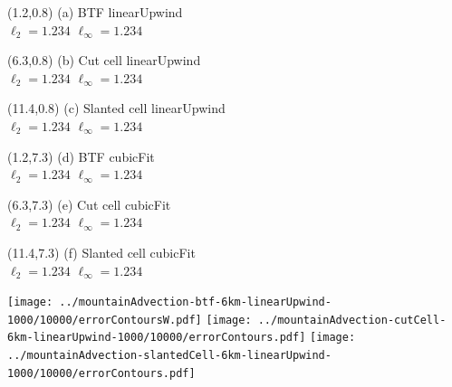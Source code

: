 \documentclass{article}
\begin{document}
\TPMargin{1pt}
\begin{textblock}{4}(1.2,0.8)
\normalsize
(a) BTF linearUpwind \\
\hspace*{1.4em}$\ell_2 = \num{1.234}$
\hspace*{1.4em}$\ell_\infty = \num{1.234}$
\end{textblock}
\begin{textblock}{4}(6.3,0.8)
\normalsize
(b) Cut cell linearUpwind \\
\hspace*{1.4em}$\ell_2 = \num{1.234}$
\hspace*{1.4em}$\ell_\infty = \num{1.234}$
\end{textblock}
\begin{textblock}{4}(11.4,0.8)
\normalsize
(c) Slanted cell linearUpwind \\
\hspace*{1.4em}$\ell_2 = \num{1.234}$
\hspace*{1.4em}$\ell_\infty = \num{1.234}$
\end{textblock}
\begin{textblock}{4}(1.2,7.3)
\normalsize
(d) BTF cubicFit \\
\hspace*{1.4em}$\ell_2 = \num{1.234}$
\hspace*{1.4em}$\ell_\infty = \num{1.234}$
\end{textblock}
\begin{textblock}{4}(6.3,7.3)
\normalsize
(e) Cut cell cubicFit \\
\hspace*{1.4em}$\ell_2 = \num{1.234}$
\hspace*{1.4em}$\ell_\infty = \num{1.234}$
\end{textblock}
\begin{textblock}{4}(11.4,7.3)
\normalsize
(f) Slanted cell cubicFit \\
\hspace*{1.4em}$\ell_2 = \num{1.234}$
\hspace*{1.4em}$\ell_\infty = \num{1.234}$
\end{textblock}
\texttt{[image: ../mountainAdvection-btf-6km-linearUpwind-1000/10000/errorContoursW.pdf]}
\hspace*{0.26em}
\texttt{[image: ../mountainAdvection-cutCell-6km-linearUpwind-1000/10000/errorContours.pdf]}
\hspace*{0.26em}
\texttt{[image: ../mountainAdvection-slantedCell-6km-linearUpwind-1000/10000/errorContours.pdf]} \\
\end{document}

